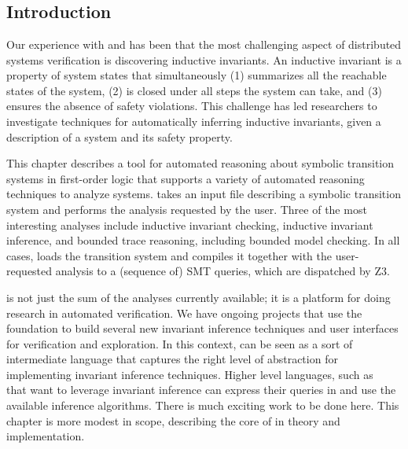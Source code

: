 \chapter{\mypyvy}
\label{chap:mypyvy}

\section{Introduction}

Our experience with \Verdi and \disel has been
  that the most challenging aspect of distributed systems verification
  is discovering inductive invariants.
An inductive invariant is a property of system states that simultaneously
  (1) summarizes all the reachable states of the system,
  (2) is closed under all steps the system can take, and
  (3) ensures the absence of safety violations.
This challenge has led researchers to investigate
  techniques for automatically inferring inductive invariants,
  given a description of a system and its safety property.

This chapter describes \mypyvy
  a tool for automated reasoning
  about symbolic transition systems in first-order logic
  that supports a variety of automated reasoning techniques to analyze systems.
\mypyvy takes an input file
  describing a symbolic transition system
  and performs the analysis requested by the user.
Three of the most interesting analyses include
  inductive invariant checking,
  inductive invariant inference, and
  bounded trace reasoning, including bounded model checking.
In all cases, \mypyvy loads the transition system
  and compiles it together with the user-requested analysis
  to a (sequence of) SMT queries,
  which are dispatched by Z3.

\mypyvy is not just the sum of the analyses currently available;
  it is a platform for doing research in automated verification.
We have ongoing projects that use the \mypyvy foundation
  to build several new invariant inference techniques
  and user interfaces for verification and exploration.
In this context, \mypyvy can be seen as a sort of intermediate language
  that captures the right level of abstraction for implementing
  invariant inference techniques.
Higher level languages, such as \ivy~\cite{Padon-al:PLDI16}
  that want to leverage invariant inference
  can express their queries in \mypyvy and
  use the available inference algorithms.
There is much exciting work to be done here.
This chapter is more modest in scope,
  describing the core of \mypyvy in theory and implementation.

